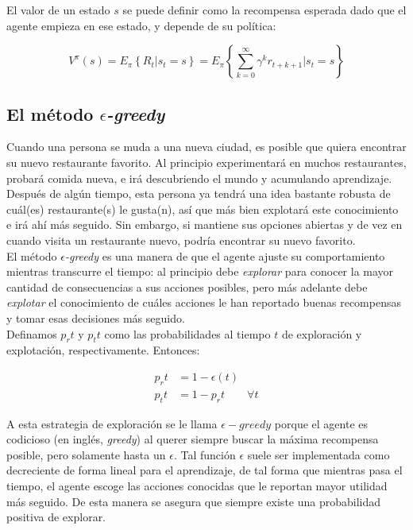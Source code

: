 El valor de un estado $s$ se puede definir como la recompensa esperada dado que el agente empieza en ese estado, y depende de su pol\'itica:

$$
V^{\pi}(s) = E_{\pi}\left\{R_{t}|s_{t} = s\right\} = E_{\pi}\left\{\sum_{k=0}^{\infty}\gamma^{k}r_{t+k+1}|s_{t}=s\right\}
$$

\subsection{El m\'etodo $\epsilon$\textit{-greedy}}

Cuando una persona se muda a una nueva ciudad, es posible que quiera encontrar su nuevo restaurante favorito. Al principio experimentar\'a en muchos restaurantes, probar\'a comida nueva, e ir\'a descubriendo el mundo y acumulando aprendizaje. Despu\'es de alg\'un tiempo, esta persona ya tendr\'a una idea bastante robusta de cu\'al(es) restaurante(s) le gusta(n), as\'i que m\'as bien explotar\'a este conocimiento e ir\'a ah\'i m\'as seguido. Sin embargo, si mantiene sus opciones abiertas y de vez en cuando visita un restaurante nuevo, podr\'ia encontrar su nuevo favorito.\\

El m\'etodo $\epsilon$\textit{-greedy} es una manera de  que el agente ajuste su comportamiento mientras transcurre el tiempo: al principio debe \textit{explorar} para conocer la mayor cantidad de consecuencias a sus acciones posibles, pero m\'as adelante debe \textit{explotar} el conocimiento de cu\'ales acciones le han reportado buenas recompensas y tomar esas decisiones m\'as seguido. \\

Definamos $p_r{t}$ y $p_t{t}$ como las probabilidades al tiempo $t$ de exploraci\'on y explotaci\'on, respectivamente. Entonces:

\vspace{-30pt}
\begin{align*}
p_r{t} &= 1 - \epsilon(t) \\
p_t{t} &= 1 - p_r{t} \quad \quad \forall t
\end{align*}

A esta estrategia de exploraci\'on se le llama $\epsilon-greedy$ porque el agente es codicioso (en ingl\'es, \textit{greedy}) al querer siempre buscar la m\'axima recompensa posible, pero solamente hasta un $\epsilon$. Tal funci\'on $\epsilon$ suele ser implementada como decreciente de forma lineal para el aprendizaje, de tal forma que mientras pasa el tiempo, el agente escoge las acciones conocidas que le reportan mayor utilidad m\'as seguido. De esta manera se asegura que siempre existe una probabilidad positiva de explorar.\\


